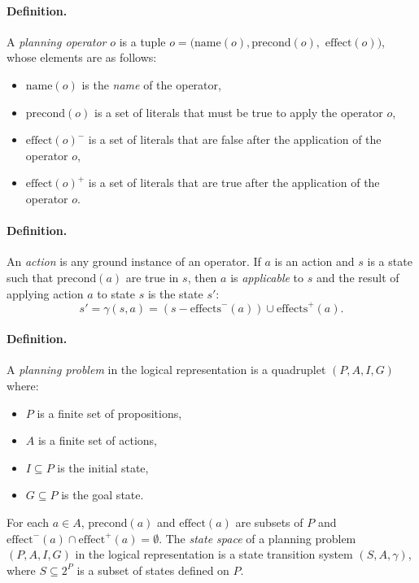 \paragraph{Definition.}
\noindent A \textit{planning operator} $o$ is a tuple $o = (\text{name}(o), \text{precond}(o),$ $\text{effect}(o))$, whose elements are as follows:
\begin{itemize}
\item $\text{name}(o)$ is the {\em name} of the operator,
\item $\text{precond}(o)$ is a set of literals that must be true to apply the operator $o$,
\item $\text{effect}(o)^{-}$ is a set of literals that are false after the application of the operator $o$,
\item $\text{effect}(o)^{+}$ is a set of literals that are true after the application of the operator $o$.
\end{itemize}

\paragraph{Definition.}
\noindent An \textit{action} is any ground instance of an operator. If $a$ is an action and $s$ is a state such that $\text{precond}(a)$ are true in $s$, then $a$ is {\em applicable} to $s$ and the result of applying action $a$ to state $s$ is the state $s'$:  
\[s' = \gamma(s, a) = (s - \text{effects}^{-}(a)) \cup \text{effects}^{+}(a).\]

\paragraph{Definition.}
A \textit{planning problem} in the logical representation is a quadruplet $(P, A, I, G)$ where:
\begin{itemize}
\item $P$ is a finite set of propositions,
\item $A$ is a finite set of actions,
\item $I \subseteq P$ is the initial state,
\item $G \subseteq P$ is the goal state.
\end{itemize}
For each $a \in A$, $\text{precond}(a)$ and $\text{effect}(a)$ are subsets of $P$ and $\text{effect}^{-}(a) \cap \text{effect}^{+}(a) = \emptyset$. The {\em state space} of a planning problem $(P, A, I, G)$ in the logical representation is a state transition system $(S, A, \gamma)$, where $S\subseteq 2^{P}$ is a subset of states defined on $P$.\\

